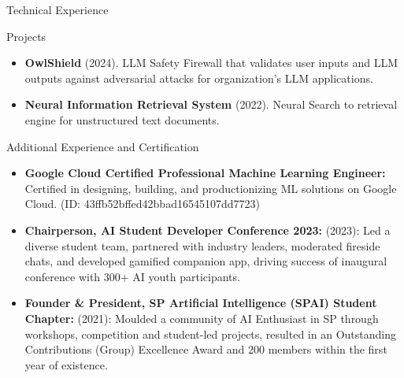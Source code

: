 \documentclass[]{mcdowellcv}
\begin{document}
    \begin{cvsection}{Technical Experience}
        \begin{cvsubsection}{Projects}{}{}
            \begin{itemize}
				
				
				
				\item \textbf{OwlShield} (2024). LLM Safety Firewall that validates user inputs and LLM outputs against adversarial attacks for organization’s LLM applications.
				
				
				
				\item \textbf{Neural Information Retrieval System} (2022). Neural Search to retrieval engine for unstructured text documents.
				
				
				
				
				
				
				
				
				
				
				
				
				
				
				
				
				
				
				
				
				
				
				
				
				
				
				
				
				
            \end{itemize}
        \end{cvsubsection}
	\end{cvsection}

	\begin{cvsection}{Additional Experience and Certification}
		\begin{cvsubsection}{}{}{}	
			\begin{itemize}
				\item \textbf{Google Cloud Certified Professional Machine Learning Engineer:} Certified in designing, building, and productionizing ML solutions on Google Cloud. (ID: 43ffb52bffed42bbad16545107dd7723)
				
				\item \textbf{Chairperson, AI Student Developer Conference 2023:} (2023): Led a diverse student team, partnered with industry leaders, moderated fireside chats, and developed gamified companion app, driving success of inaugural conference with 300+ AI youth participants.
				
				\item \textbf{Founder \& President, SP Artificial Intelligence (SPAI) Student Chapter:} (2021): Moulded a community of AI Enthusiast in SP through workshops, competition and student-led projects, resulted in an Outstanding Contributions (Group) Excellence Award and 200 members within the first year of existence.
				
			\end{itemize}
		\end{cvsubsection}
	\end{cvsection}
	
\end{document}
